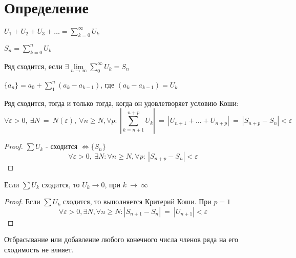 \section{Определение}

\begin{definition}
  $U_1 + U_2 + U_3 + \dots = \sum\limits_{k = 0}^{\infty}{U_k}$
\end{definition}

\begin{definition}
  $S_n = \sum\limits_{k = 0}^n U_k$
\end{definition}

\begin{definition}
  Ряд сходится, если $\exists \lim\limits_{n \to \infty}
                      \sum\limits_0^\infty U_k = S_n$
\end{definition}

\begin{definition}
  $\{a_n\} = a_0 + \sum\limits_1^n (a_k - a_{k-1})$, где $(a_k - a_{k - 1}) = U_k$
\end{definition}

\begin{theorem}
  Ряд сходится, тогда и только тогда, когда он удовлетворяет условию Коши: \\
  $$\forall \varepsilon > 0, \ \exists N~=~N(\varepsilon), \
  \forall n \geq N, \forall p: \ |\sum\limits_{k=n+1}^{n+p} U_k|~=~|U_{n+1}
  + \dots + U_{n+p}|~=~|S_{n+p} - S_{n}| < \varepsilon$$
\end{theorem}

\begin{proof}
  $\sum U_k$ - сходится $\Leftrightarrow \{S_n\}$
  $$\forall \varepsilon > 0, \ \exists N: \forall n \geq N, \forall p: \
  |S_{n+p} - S_{n}| < \varepsilon$$
\end{proof}
\begin{consequence}
  Если $\sum U_k$ сходится, то $U_k \to 0$, при $k~\to~\infty$
\end{consequence}
\begin{proof}
  Если $\sum U_k$ сходится, то выполняется Критерий Коши. При $p = 1$
  $$\forall \varepsilon > 0, \exists N, \forall n \geq N:
  |S_{n+1} - S_n|~=~|U_{n+1}| < \varepsilon$$
\end{proof}
\begin{consequence}
  Отбрасывание или добавление любого конечного числа членов ряда на его
  сходимость не влияет.
\end{consequence}

